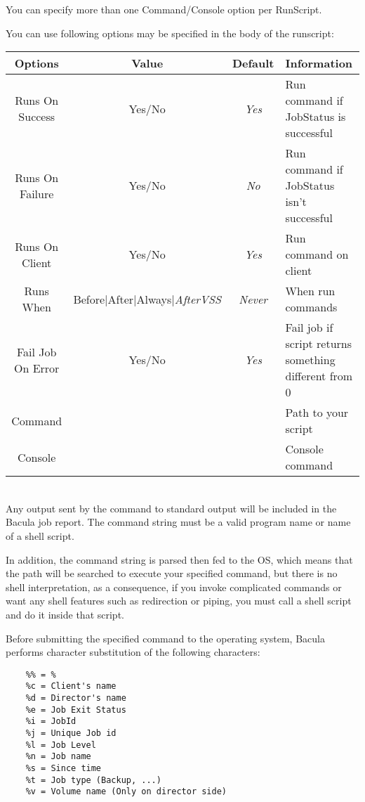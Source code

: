 \begin{description}
   You can specify more than one Command/Console option per RunScript.

   You can use following options may be specified in the body
   of the runscript:\\

\begin{tabular}{|c|c|c|l}
Options         & Value  & Default & Information   \\
\hline
\hline
Runs On Success & Yes/No & {\it Yes} & Run command if JobStatus is successful\\
\hline
Runs On Failure & Yes/No & {\it No} & Run command if JobStatus isn't successful\\
\hline
Runs On Client  & Yes/No & {\it Yes} & Run command on client\\
\hline
Runs When       & Before|After|Always|\textsl{AfterVSS} & {\it Never} & When run commands\\
\hline
Fail Job On Error & Yes/No & {\it Yes} & Fail job if script returns 
                                          something different from 0 \\
\hline
Command          &       &          & Path to your script\\
\hline
Console          &       &          & Console command\\
\hline
\end{tabular}
   \\

   Any output sent by the command to standard output will be included in the
   Bacula job report.  The command string must be a valid program name or name
   of a shell script.

   In addition, the command string is parsed then fed to the OS,
   which means that the path will be searched to execute your specified
   command, but there is no shell interpretation, as a consequence, if you
   invoke complicated commands or want any shell features such as redirection
   or piping, you must call a shell script and do it inside that script.
 
   Before submitting the specified command to the operating system, Bacula
   performs character substitution of the following characters:

\label{character substitution}
\footnotesize
\begin{verbatim}
    %% = %
    %c = Client's name
    %d = Director's name
    %e = Job Exit Status
    %i = JobId
    %j = Unique Job id
    %l = Job Level
    %n = Job name
    %s = Since time
    %t = Job type (Backup, ...)
    %v = Volume name (Only on director side)
 

\end{verbatim}
\end{description}
